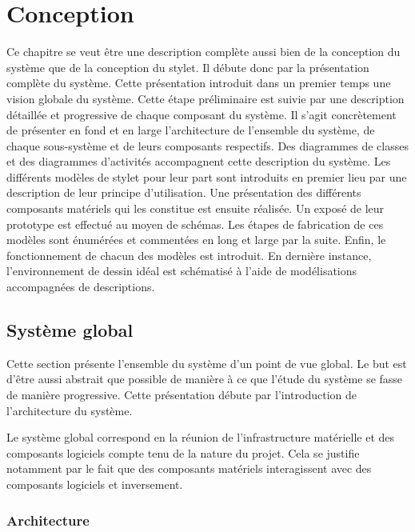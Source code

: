 \documentclass[11pt,a4paper,oldfontcommands]{memoir}
\begin{document}

\chapter{Conception}

Ce chapitre se veut être une description complète aussi bien de la conception du système que de la conception du stylet. Il débute donc par la présentation complète du système. Cette présentation introduit dans un premier temps une vision globale du système. Cette étape préliminaire est suivie par une description détaillée et progressive de chaque composant du système. Il s'agit concrètement de présenter en fond et en large l'architecture de l'ensemble du système, de chaque sous-système et de leurs composants respectifs. Des diagrammes de classes et des diagrammes d'activités accompagnent cette description du système. Les différents modèles de stylet pour leur part sont introduits en premier lieu par une description de leur principe d'utilisation. Une présentation des différents composants matériels qui les constitue est ensuite réalisée. Un exposé de leur prototype est effectué au moyen de schémas. Les étapes de fabrication de ces modèles sont énumérées et commentées en long et large par la suite. Enfin, le fonctionnement de chacun des modèles est introduit. En dernière instance, l'environnement de dessin idéal est schématisé à l'aide de modélisations accompagnées de descriptions.

\section{Système global}

Cette section présente l'ensemble du système d'un point de vue global. Le but est d'être aussi abstrait que possible de manière à ce que l'étude du système se fasse de manière progressive. Cette présentation débute par l'introduction de l'architecture du système. 

Le système global correspond en la réunion de l'infrastructure matérielle et des composants logiciels compte tenu de la nature du projet. Cela se justifie notamment par le fait que des composants matériels interagissent avec des composants logiciels et inversement.

\subsection{Architecture}
\end{document}
